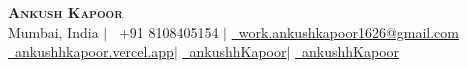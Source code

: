 \documentclass[letterpaper,11pt]{article}
\begin{document}





\begin{center}
    {\huge \scshape \textbf{Ankush Kapoor}}\\[6pt]
Mumbai, India \hspace{5pt}$|$\hspace{5pt}
\raisebox{-0.15\height}{\faPhone}~+91 8108405154 \hspace{5pt}$|$\hspace{5pt}
\href{mailto:work.ankushkapoor1626@gmail.com}
{\raisebox{-0.15\height}{\faEnvelope}~\underline{work.ankushkapoor1626@gmail.com}}\\[4pt]
\href{https://ankushhkapoor.vercel.app}
{\raisebox{-0.15\height}{\faGlobe}~\underline{ankushhkapoor.vercel.app}}\hspace{5pt}$|$\hspace{5pt}
\href{https://linkedin.com/in/ankushhKapoor}
{\raisebox{-0.15\height}{\faLinkedin}~\underline{ankushhKapoor}}\hspace{5pt}$|$\hspace{5pt}
\href{https://github.com/ankushhKapoor}
{\raisebox{-0.15\height}{\faGithub}~\underline{ankushhKapoor}}
    \vspace{-8pt}
\end{center}
\end{document}
